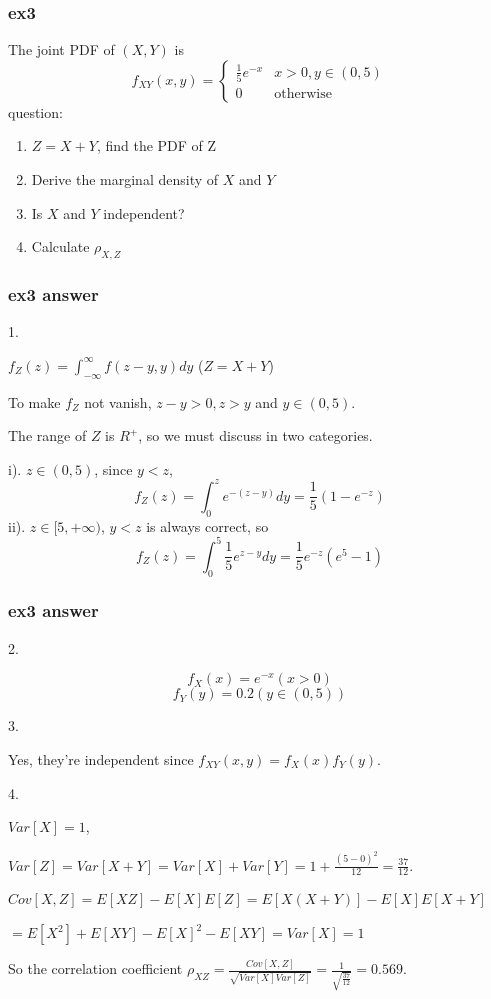 \documentclass{beamer}
\begin{document}
\begin{frame}
    \frametitle{ex3 }

    The joint PDF of $(X,Y)$ is
    \begin{equation*}
        f_{XY}(x,y)=
        \begin{cases}
            \frac{1}{5}e^{-x} & x>0, y\in (0,5)\\
            0 & \text{otherwise}
        \end{cases}
    \end{equation*}
    question:
    \begin{enumerate}
        \item $Z=X+Y$, find the PDF of Z
        \item Derive the marginal density of $X$ and $Y$
        \item Is $X$ and $Y$ independent?
        \item Calculate $\rho_{X,Z}$
    \end{enumerate}

\end{frame}

\begin{frame}
    \frametitle{ex3 answer}

    1. \par
    $f_{Z}(z)=\int_{-\infty}^{\infty}f(z-y,y)dy$ ($Z=X+Y$)\par
    To make $f_Z$ not vanish, $z-y>0, z>y$ and $y\in (0,5)$.\par
    The range of $Z$ is $R^{+}$, so we must discuss in two categories.\par
    i). $z\in(0,5)$, since $y<z$, 
    \[f_Z(z)=\int_{0}^{z}e^{-(z-y)}dy=\frac{1}{5}(1-e^{-z})\]
    ii). $z\in [5, +\infty)$, $y<z$ is always correct, so
    \[f_Z(z)=\int_{0}^{5}\frac{1}{5}e^{z-y}dy=\frac{1}{5}e^{-z}(e^5-1)\]

\end{frame}

\begin{frame}
    \frametitle{ex3 answer}

    2. \par
    \[f_{X}(x)=e^{-x} (x>0)\]
    \[f_{Y}(y)=0.2 (y\in (0,5))\]

    3. \par
    Yes, they're independent since $f_{XY}(x,y)=f_{X}(x)f_{Y}(y)$.\par
    \vspace{0.3cm}

    4. \par
    $Var[X]=1$, \par
    $Var[Z]=Var[X+Y]=Var[X]+Var[Y]=1+\frac{(5-0)^2}{12}=\frac{37}{12}$.\par
    $Cov[X,Z]=E[XZ]-E[X]E[Z]=E[X(X+Y)]-E[X]E[X+Y]$\par
    $=E[X^2]+E[XY]-E[X]^2-E[XY]=Var[X]=1$\par
    So the correlation coefficient $\rho_{XZ}=\frac{Cov[X,Z]}{\sqrt{Var[X]Var[Z]}}=\frac{1}{\sqrt{\frac{37}{12}}}=0.569$.

\end{frame}
\end{document}
